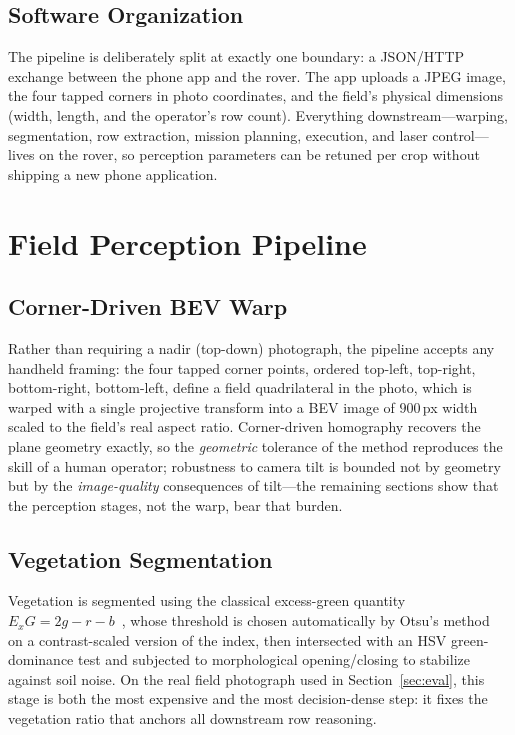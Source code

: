 \documentclass[conference]{IEEEtran}
\begin{document}
\subsection{Software Organization}
The pipeline is deliberately split at exactly one boundary: a JSON/HTTP
exchange between the phone app and the rover. The app uploads a JPEG image,
the four tapped corners in photo coordinates, and the field's physical
dimensions (width, length, and the operator's row count). Everything
downstream---warping, segmentation, row extraction, mission planning,
execution, and laser control---lives on the rover, so perception parameters
can be retuned per crop without shipping a new phone application.

\section{Field Perception Pipeline}\label{sec:perception}

\subsection{Corner-Driven BEV Warp}
Rather than requiring a nadir (top-down) photograph, the pipeline accepts any
handheld framing: the four tapped corner points, ordered top-left, top-right,
bottom-right, bottom-left, define a field quadrilateral in the photo, which
is warped with a single projective transform into a BEV image of
$900$\,px width scaled to the field's real aspect ratio. Corner-driven
homography recovers the plane geometry exactly, so the \emph{geometric}
tolerance of the method reproduces the skill of a human operator; robustness
to camera tilt is bounded not by geometry but by the \emph{image-quality}
consequences of tilt---the remaining sections show that the perception
stages, not the warp, bear that burden.

\subsection{Vegetation Segmentation}
Vegetation is segmented using the classical excess-green quantity
$E_xG = 2g - r - b$~\cite{woebbecke1995}, whose threshold is chosen
automatically by Otsu's method~\cite{otsu1979} on a contrast-scaled version of
the index, then intersected with an HSV green-dominance test and subjected to
morphological opening/closing to stabilize against soil noise. On the real
field photograph used in Section~\ref{sec:eval}, this stage is both the most
expensive and the most decision-dense step: it fixes the vegetation ratio
that anchors all downstream row reasoning.
\end{document}
